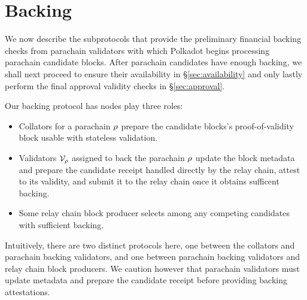 
\section{Backing}
\label{sec:backing}

\newcommand\qin{\ensuremath{q_{\mathsf{in}}}}
\newcommand\qout{\ensuremath{q_{\mathsf{out}}}}

We now describe the subprotocols that provide the preliminary financial backing checks from parachain validators with which Polkadot begins processing parachain candidate blocks.  After parachain candidates have enough backing, we shall next proceed to ensure their availability in \S\ref{sec:availability} and only lastly perform the final approval validity checks in \S\ref{sec:approval}.

Our backing protocol has nodes play three roles:
\begin{itemize}
\item Collators for a parachain $\rho$ prepare the candidate blocks's proof-of-validity block usable with stateless validation.
\item Validators $\mathcal{V}_{\rho}$ assigned to back the parachain $\rho$ update the block metadata and prepare the candidate receipt handled directly by the relay chain, attest to its validity, and submit it to the relay chain once it obtains sufficent backing. 
\item Some relay chain block producer selects among any competing candidates with sufficient backing.
\end{itemize}
Intuitively, there are two distinct protocols here, one between the collators and parachain backing validators, and one between parachain backing validators and relay chain block producers.  We caution however that parachain validators must update metadata and prepare the candidate receipt before providing backing attestations.



